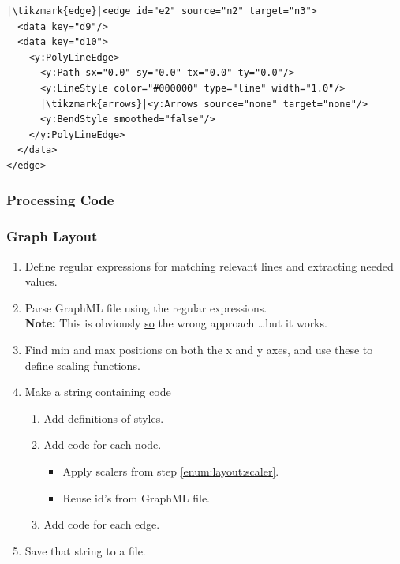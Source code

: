 {\begin{frame}[fragile]
  \begin{verbatim}
|\tikzmark{edge}|<edge id="e2" source="n2" target="n3">
  <data key="d9"/>
  <data key="d10">
    <y:PolyLineEdge>
      <y:Path sx="0.0" sy="0.0" tx="0.0" ty="0.0"/>
      <y:LineStyle color="#000000" type="line" width="1.0"/>
      |\tikzmark{arrows}|<y:Arrows source="none" target="none"/>
      <y:BendStyle smoothed="false"/>
    </y:PolyLineEdge>
  </data>
</edge>
  \end{verbatim}
\end{frame}

\subsubsection{Processing Code}
\begin{frame}[fragile]
  \frametitle{Graph Layout }
  \vspace{3mm}
  \begin{enumerate}
    \item Define regular expressions for matching relevant lines and extracting needed values.
    \item Parse GraphML file using the regular expressions.
          \\
          \textbf{Note:} This is obviously \underline{so} the wrong approach \ldots but it works.
    \item \label{enum:layout:scaler} Find min and max positions on both the x and y axes, and use these to define scaling functions.
    \item Make a string containing \TikZ code
      \begin{enumerate}
        \item Add definitions of styles.
        \item Add code for each node.
          \begin{itemize}
            \item Apply scalers from step \ref{enum:layout:scaler}.
            \item Reuse id's from GraphML file.
          \end{itemize}
        \item Add code for each edge.
      \end{enumerate}
    \item Save that string to a file.
  \end{enumerate}
\end{frame}

}
